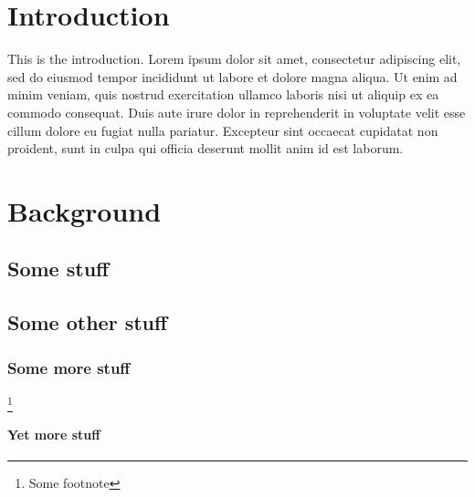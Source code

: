 \documentclass[a4paper]{ufsc-thesis-rn46-2019}
\begin{document}
\pretextual%
\imprimircapa%
\imprimirfolhaderosto*%
\clearpage
\tableofcontents%
\textual%
\cleardoublepage

\chapter{Introduction}

This is the introduction. Lorem ipsum dolor sit amet, consectetur adipiscing elit, sed do eiusmod tempor incididunt ut labore et dolore magna aliqua. Ut enim ad minim veniam, quis nostrud exercitation ullamco laboris nisi ut aliquip ex ea commodo consequat. Duis aute irure dolor in reprehenderit in voluptate velit esse cillum dolore eu fugiat nulla pariatur. Excepteur sint occaecat cupidatat non proident, sunt in culpa qui officia deserunt mollit anim id est laborum.

\lipsum[1]

\chapter{Background}

\lipsum[1]

\section{Some stuff}

\lipsum[1]

\section{Some other stuff}

\lipsum[1]

\lipsum[1]

\lipsum[1]

\lipsum[1]

\lipsum[1]

\lipsum[1]

\lipsum[1]

\subsection{Some more stuff}

\lipsum[1] \footnote{Some footnote}

\subsubsection{Yet more stuff}

\lipsum[1]


\lipsum[1]
\end{document}
